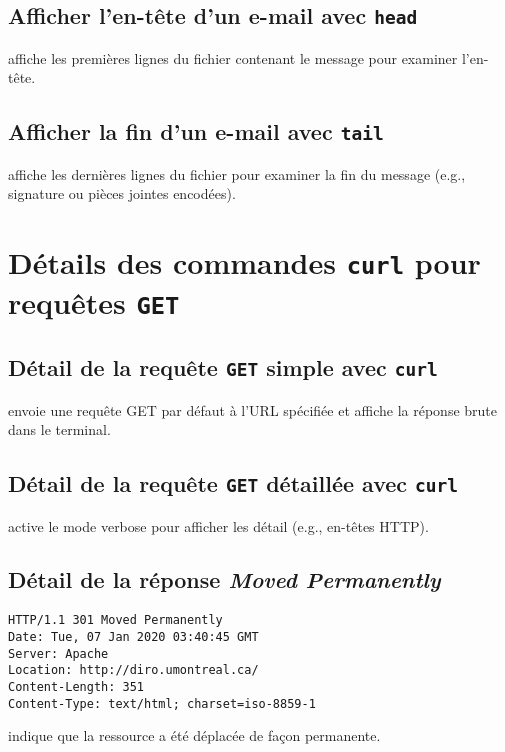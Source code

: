 \documentclass[a4paper]{report}
\begin{document}
\subsection{Afficher l'en-tête d'un e-mail avec \texttt{head}}
    affiche les premières lignes du fichier contenant le message pour 
    examiner l'en-tête.

\subsection{Afficher la fin d'un e-mail avec \texttt{tail}}
    affiche les dernières lignes du fichier pour examiner la fin 
    du message (e.g., signature ou pièces jointes encodées).


    \section{Détails des commandes \texttt{curl} pour requêtes \texttt{GET}}
\subsection{Détail de la requête \texttt{GET} simple avec \texttt{curl}}
envoie une requête GET par défaut à l'URL spécifiée et affiche la réponse brute 
dans le terminal.

\subsection{Détail de la requête \texttt{GET} détaillée avec \texttt{curl}}
active le mode verbose pour afficher les détail
(e.g., en-têtes HTTP).

\subsection{Détail de la réponse \emph{Moved Permanently}}
\begin{verbatim}
HTTP/1.1 301 Moved Permanently
Date: Tue, 07 Jan 2020 03:40:45 GMT
Server: Apache
Location: http://diro.umontreal.ca/
Content-Length: 351
Content-Type: text/html; charset=iso-8859-1
\end{verbatim}
\noindent{} indique que la ressource a été 
déplacée de façon permanente.  
\end{document}
